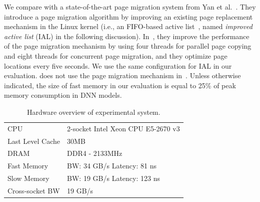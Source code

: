 We compare \name with a state-of-the-art page migration system from Yan et al.~\cite{Yan:ASPLOS19}. They introduce a page migration algorithm by improving an existing page replacement mechanism in the Linux kernel (i.e., an FIFO-based active list~\cite{Yan:ASPLOS19}, named \textit{improved active list} (IAL) in the following discussion). In~\cite{Yan:ASPLOS19}, they improve the performance of the page migration mechanism by using four threads for parallel page copying and eight threads for concurrent page migration, and they optimize page locations every five seconds. \textcolor{check}{We use the same configuration for IAL in our evaluation}. \name does not use the page migration mechanism in~\cite{Yan:ASPLOS19}. Unless otherwise indicated, \textcolor{check}{the size of fast memory in our evaluation is equal to 25\% of peak memory consumption in DNN models.}


\begin{table}[tbp]
\centering
\small
\caption{Hardware overview of experimental system.}
\vspace{-5pt}
\begin{tabular}{ll}
\hline
CPU& 2-socket Intel Xeon CPU E5-2670 v3 \\ %
\textcolor{check}{Last Level Cache} & 30MB \\
DRAM& DDR4 - 2133MHz   \\
Fast Memory & BW: 34 GB/s  \phantom{L}  Latency: 81 ns \\ %
Slow Memory& BW: 19 GB/s  \phantom{L}  Latency: 123 ns\\
Cross-socket BW & 19 GB/s\\ 
\hline
\end{tabular}
\vspace{-5pt}
\label{tab:hardware}
\end{table}




